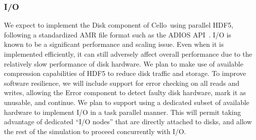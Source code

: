 \documentclass[11pt,letterpaper]{article}
\newcommand{\cello}{\textsf{Cello}}
\newcommand{\pp}{\texttt{++}}
\newcommand{\cpp}{C\pp}
\newcommand{\code}[1]{\textsf{#1}}
\begin{document}
% 

\subsubsection{I/O} \label{sss:design-io}

We expect to implement the \code{Disk} component of \cello\ using
parallel HDF5, following a standardized AMR file format such as the
ADIOS API~\cite{LoKl08}.  I/O is known to be a significant performance
and scaling issue.  Even when it is implemented efficiently, it can
still adversely affect overall performance due to the relatively slow
performance of disk hardware.  We plan to make use of available
compression capabilities of HDF5 to reduce disk traffic and storage.
To improve software resilience, we will include support for error
checking on all reads and writes, allowing the \code{Error} component
to detect faulty disk hardware, mark it as unusable, and continue.
We plan to support using a dedicated subset of available hardware to
implement I/O in a task parallel manner.  This will permit taking
advantage of dedicated ``I/O nodes'' that are directly attached to
disks, and allow the rest of the simulation to proceed concurrently
with I/O.
\end{document}
